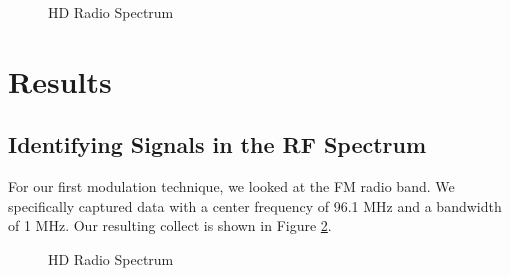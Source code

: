 \documentclass{article}
\begin{document}
\begin{figure}[H]
	\centerline{}
	\caption{HD Radio Spectrum}
	\label{fig::sweeping_the_spectrum}
\end{figure}

\section{Results}


\subsection{Identifying Signals in the RF Spectrum}

For our first modulation technique, we looked at the FM radio band. We specifically captured data with a center frequency of 96.1 MHz and a bandwidth of 1 MHz. Our resulting collect is shown in Figure \ref{fig::hd_radio_spectrum}.

\begin{figure}[H]
	\centerline{}
	\caption{HD Radio Spectrum}
	\label{fig::hd_radio_spectrum}
\end{figure}

\end{document}
